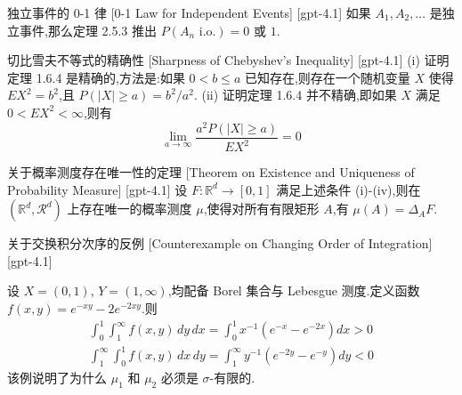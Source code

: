 \documentclass[UTF8]{ctexart}
\begin{document}
    
    
    \begin{thm}
        {独立事件的 0-1 律}
        [0-1 Law for Independent Events]
        [gpt-4.1]
        如果 $A_{1}, A_{2}, \ldots$ 是独立事件,那么定理 2.5.3 推出 $P(A_{n} \text{ i.o.}) = 0$ 或 $1$.
    \end{thm}
    
    
    
    \begin{thm}
        {切比雪夫不等式的精确性}
        [Sharpness of Chebyshev's Inequality]
        [gpt-4.1]
        (i) 证明定理 1.6.4 是精确的,方法是:如果 $0 < b \leq a$ 已知存在,则存在一个随机变量 $X$ 使得 $E X^2 = b^2$,且 $P(|X| \geq a) = b^2 / a^2$.
(ii) 证明定理 1.6.4 并不精确,即如果 $X$ 满足 $0 < E X^2 < \infty$,则有
\[
\lim_{a \to \infty} \frac{a^2 P(|X| \geq a)}{E X^2} = 0
\]

    \end{thm}
    
    
    
    \begin{thm}
        {关于概率测度存在唯一性的定理}
        [Theorem on Existence and Uniqueness of Probability Measure]
        [gpt-4.1]
        设 $F : \mathbb{R}^d \to [0, 1]$ 满足上述条件 (i)-(iv),则在 $(\mathbb{R}^d, \mathcal{R}^d)$ 上存在唯一的概率测度 $\mu$,使得对所有有限矩形 $A$,有 $\mu(A) = \Delta_A F$.
    \end{thm}
    
    
    
    \begin{xmp}
        {关于交换积分次序的反例}
        [Counterexample on Changing Order of Integration]
        [gpt-4.1]
        
设 $X = (0, 1)$, $Y = (1, \infty)$,均配备 Borel 集合与 Lebesgue 测度.定义函数 $f(x, y) = e^{-xy} - 2e^{-2xy}$.则
\[
\begin{array}{l}
\displaystyle \int_{0}^{1} \int_{1}^{\infty} f(x, y) \, dy \, dx = \int_{0}^{1} x^{-1} (e^{-x} - e^{-2x}) dx > 0 \\
\displaystyle \int_{1}^{\infty} \int_{0}^{1} f(x, y) \, dx \, dy = \int_{1}^{\infty} y^{-1} (e^{-2y} - e^{-y}) dy < 0
\end{array}
\]
该例说明了为什么 $\mu_1$ 和 $\mu_2$ 必须是 $\sigma$-有限的.

    \end{xmp}
    
\end{document}
